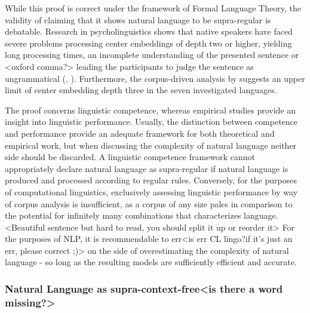 While this proof is correct under the framework of Formal Language Theory, the validity of claiming that it shows natural language to be supra-regular is debatable. Research in psycholinguistics shows that native speakers have faced severe problems processing center embeddings of depth two or higher, yielding long processing times, an incomplete understanding of the presented sentence or <oxford comma?> leading the participants to judge the sentence as ungrammatical (\cite{Hamilton1971}, \cite{Frank2016}). Furthermore, the corpus-driven analysis by \cite{Karlsson2007} suggests an upper limit of center embedding depth three in the seven investigated languages.

The proof concerns linguistic competence, whereas empirical studies provide an insight into linguistic performance. Usually, the distinction between competence and performance provide an adequate framework for both theoretical and empirical work, but when discussing the complexity of natural language neither side should be discarded. A linguistic competence framework cannot appropriately declare natural language as supra-regular if natural language is produced and processed according to regular rules. Conversely, for the purposes of computational linguistics, exclusively assessing linguistic performance by way of corpus analysis is insufficient, as a corpus of any size pales in comparison to the potential for infinitely many combinations that characterizes language.<Beautiful sentence but hard to read, you should split it up or reorder it> For the purposes of NLP, it is recommendable to err<is err CL lingo?if it's just an err, please correct ;)> on the side of overestimating the complexity of natural language - so long as the resulting models are sufficiently efficient and accurate.

\subsubsection{Natural Language as supra-context-free<is there a word missing?>}

